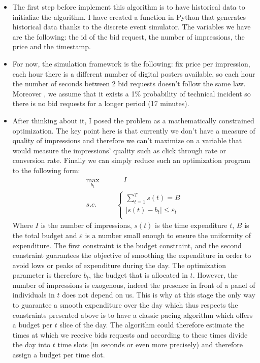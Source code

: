 \documentclass[12pt]{article}
\begin{document}
\begin{itemize}
\item The first step before implement this algorithm is to have historical data to initialize the algorithm. I have created a function in Python that generates historical data thanks to the discrete event simulator. The variables we have are the following: the id of the bid request, the number of impressions, the price and the timestamp.
\item For now, the simulation framework is the following: fix price per impression, each hour there is a different number of digital posters available, so each hour the number of seconds between 2 bid requests doesn't follow the same law. Moreover , we assume that it exists a 1\% probability of technical incident so there is no bid requests for a longer period (17 minutes). 
\item After thinking about it, I posed the problem as a mathematically constrained optimization. The key point here is that currently we don't have a measure of quality of impressions and therefore we can't maximize on a variable that would measure the impressions' quality such as click through rate or conversion rate. Finally we can simply reduce such an optimization program to the following form:
\begin{align*}
\max_{b_t} &\quad I \\
s.c.  \qquad & 
\left\{
	\begin{array}{ll} 
		\displaystyle \sum_{t=1}^{T} s(t) = B\\
		|s(t) - b_t | \leq \varepsilon_t\\
	\end{array}
\right.
\end{align*}
Where $I$ is the number of impressions, $s(t)$ is the time expenditure $t$, $B$ is the total budget and $\varepsilon$ is a number small enough to ensure the uniformity of expenditure. The first constraint is the budget constraint, and the second constraint guarantees the objective of smoothing the expenditure in order to avoid lows or peaks of expenditure during the day. The optimization parameter is therefore $b_t$, the budget that is allocated in $t$. However, the number of impressions is exogenous, indeed the presence in front of a panel of individuals in $t$ does not depend on us. This is why at this stage the only way to guarantee a smooth expenditure over the day which thus respects the constraints presented above is to have a classic pacing algorithm which offers a budget per $t$ slice of the day. The algorithm could therefore estimate the times at which we receive bids requests and according to these times divide the day into $t$ time slots (in seconds or even more precisely) and therefore assign a budget per time slot. 

\end{itemize}
\end{document}
